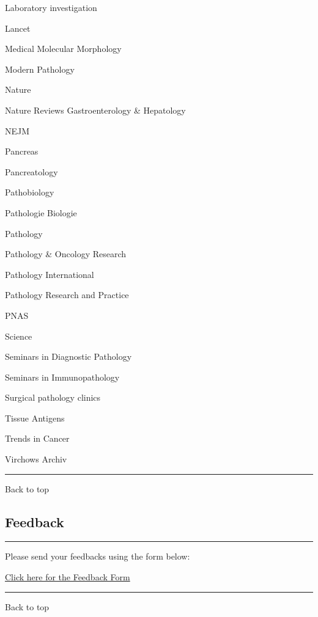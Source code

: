 \documentclass[]{article}
\begin{document}
Laboratory investigation

Lancet

Medical Molecular Morphology

Modern Pathology

Nature

Nature Reviews Gastroenterology \& Hepatology

NEJM

Pancreas

Pancreatology

Pathobiology

Pathologie Biologie

Pathology

Pathology \& Oncology Research

Pathology International

Pathology Research and Practice

PNAS

Science

Seminars in Diagnostic Pathology

Seminars in Immunopathology

Surgical pathology clinics

Tissue Antigens

Trends in Cancer

Virchows Archiv

\begin{center}\rule{0.5\linewidth}{\linethickness}\end{center}

Back to top

\pagebreak

\hypertarget{feedback}{%
\subsection{Feedback}\label{feedback}}

\begin{center}\rule{0.5\linewidth}{\linethickness}\end{center}

Please send your feedbacks using the form below:

\href{https://docs.google.com/forms/d/e/1FAIpQLSeD3Z9J6Y7eMmiyM12f_SfAmHUlykb1zxZcwO6lg7cebGYQIQ/viewform}{Click
here for the Feedback Form}

\begin{center}\rule{0.5\linewidth}{\linethickness}\end{center}

Back to top
\end{document}
